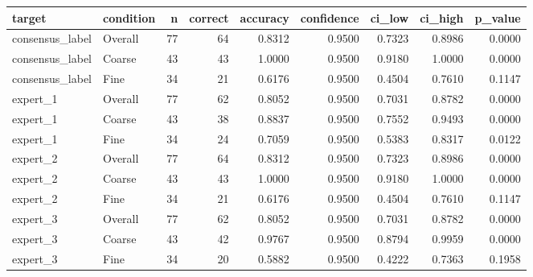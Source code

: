 \begin{tabular}{llrrrrrrr}
\toprule
target & condition & n & correct & accuracy & confidence & ci_low & ci_high & p_value \\
\midrule
consensus_label & Overall & 77 & 64 & 0.8312 & 0.9500 & 0.7323 & 0.8986 & 0.0000 \\
consensus_label & Coarse & 43 & 43 & 1.0000 & 0.9500 & 0.9180 & 1.0000 & 0.0000 \\
consensus_label & Fine & 34 & 21 & 0.6176 & 0.9500 & 0.4504 & 0.7610 & 0.1147 \\
expert_1 & Overall & 77 & 62 & 0.8052 & 0.9500 & 0.7031 & 0.8782 & 0.0000 \\
expert_1 & Coarse & 43 & 38 & 0.8837 & 0.9500 & 0.7552 & 0.9493 & 0.0000 \\
expert_1 & Fine & 34 & 24 & 0.7059 & 0.9500 & 0.5383 & 0.8317 & 0.0122 \\
expert_2 & Overall & 77 & 64 & 0.8312 & 0.9500 & 0.7323 & 0.8986 & 0.0000 \\
expert_2 & Coarse & 43 & 43 & 1.0000 & 0.9500 & 0.9180 & 1.0000 & 0.0000 \\
expert_2 & Fine & 34 & 21 & 0.6176 & 0.9500 & 0.4504 & 0.7610 & 0.1147 \\
expert_3 & Overall & 77 & 62 & 0.8052 & 0.9500 & 0.7031 & 0.8782 & 0.0000 \\
expert_3 & Coarse & 43 & 42 & 0.9767 & 0.9500 & 0.8794 & 0.9959 & 0.0000 \\
expert_3 & Fine & 34 & 20 & 0.5882 & 0.9500 & 0.4222 & 0.7363 & 0.1958 \\
\bottomrule
\end{tabular}
